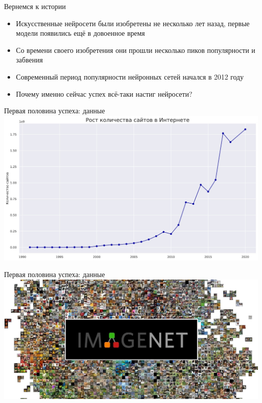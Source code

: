 \documentclass[aspectratio=169]{beamer}
\begin{document}
\begin{frame}{Вернемся к истории}
    \large
    \begin{itemize}
        \item Искусственные нейросети были изобретены не несколько лет назад,
        первые модели появились ещё в довоенное время
        \pause{}
        \item Со времени своего изобретения они прошли несколько пиков популярности
        и забвения
        \pause{}
        \item Современный период популярности нейронных сетей начался в 2012 году
        \item Почему именно сейчас успех всё-таки настиг нейросети?
    \end{itemize}
\end{frame}

\begin{frame}{Первая половина успеха: данные}
    \centering
    \includegraphics[width=.84\linewidth]{graphs/fig19.jpg}
\end{frame}

\begin{frame}{Первая половина успеха: данные}
    \centering
    \includegraphics[width=\linewidth]{graphs/fig20.jpg}
\end{frame}
\end{document}
